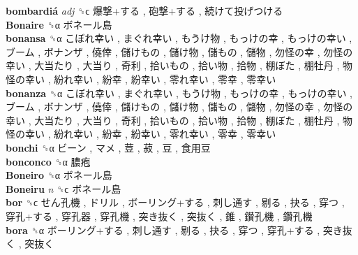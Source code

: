 \textbf{bombardiá} \emph{adj}  ␝ϲ   爆撃+する ,  砲撃+する ,  続けて投げつける   \\
\textbf{Bonaire} ␝α   ボネール島   \\
\textbf{bonansa} ␝α   こぼれ幸い ,  まぐれ幸い ,  もうけ物 ,  もっけの幸 ,  もっけの幸い ,  ブーム ,  ボナンザ ,  僥倖 ,  儲けもの ,  儲け物 ,  儲もの ,  儲物 ,  勿怪の幸 ,  勿怪の幸い ,  大当たり ,  大当り ,  奇利 ,  拾いもの ,  拾い物 ,  拾物 ,  棚ぼた ,  棚牡丹 ,  物怪の幸い ,  紛れ幸い ,  紛幸 ,  紛幸い ,  零れ幸い ,  零幸 ,  零幸い   \\
\textbf{bonanza} ␝α   こぼれ幸い ,  まぐれ幸い ,  もうけ物 ,  もっけの幸 ,  もっけの幸い ,  ブーム ,  ボナンザ ,  僥倖 ,  儲けもの ,  儲け物 ,  儲もの ,  儲物 ,  勿怪の幸 ,  勿怪の幸い ,  大当たり ,  大当り ,  奇利 ,  拾いもの ,  拾い物 ,  拾物 ,  棚ぼた ,  棚牡丹 ,  物怪の幸い ,  紛れ幸い ,  紛幸 ,  紛幸い ,  零れ幸い ,  零幸 ,  零幸い   \\
\textbf{bonchi} ␝α   ビーン ,  マメ ,  荳 ,  菽 ,  豆 ,  食用豆   \\
\textbf{bonconco} ␝α   膿疱   \\
\textbf{Boneiro} ␝α   ボネール島   \\
\textbf{Boneiru} \emph{n}  ␝ϲ   ボネール島   \\
\textbf{bor} ␝ϲ   せん孔機 ,  ドリル ,  ボーリング+する ,  刺し通す ,  剔る ,  抉る ,  穿つ ,  穿孔+する ,  穿孔器 ,  穿孔機 ,  突き抜く ,  突抜く ,  錐 ,  鑚孔機 ,  鑽孔機   \\
\textbf{bora} ␝α   ボーリング+する ,  刺し通す ,  剔る ,  抉る ,  穿つ ,  穿孔+する ,  突き抜く ,  突抜く   \\
